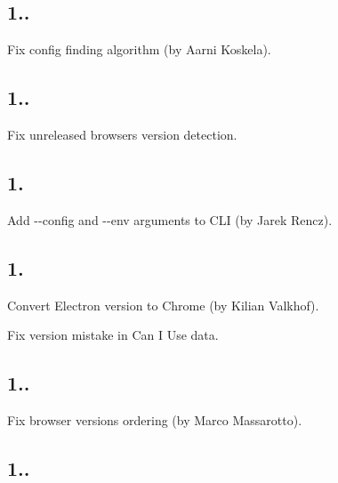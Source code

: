 \subsection*{1..}


\begin{DoxyItemize}
\item Fix config finding algorithm (by Aarni Koskela).
\end{DoxyItemize}

\subsection*{1..}


\begin{DoxyItemize}
\item Fix unreleased browsers version detection.
\end{DoxyItemize}

\subsection*{1.}


\begin{DoxyItemize}
\item Add {\ttfamily -\/-\/config} and {\ttfamily -\/-\/env} arguments to C\+LI (by Jarek Rencz).
\end{DoxyItemize}

\subsection*{1.}


\begin{DoxyItemize}
\item Convert Electron version to Chrome (by Kilian Valkhof).
\item Fix {} version mistake in Can I Use data.
\end{DoxyItemize}

\subsection*{1..}


\begin{DoxyItemize}
\item Fix browser versions ordering (by Marco Massarotto).
\end{DoxyItemize}

\subsection*{1..}


